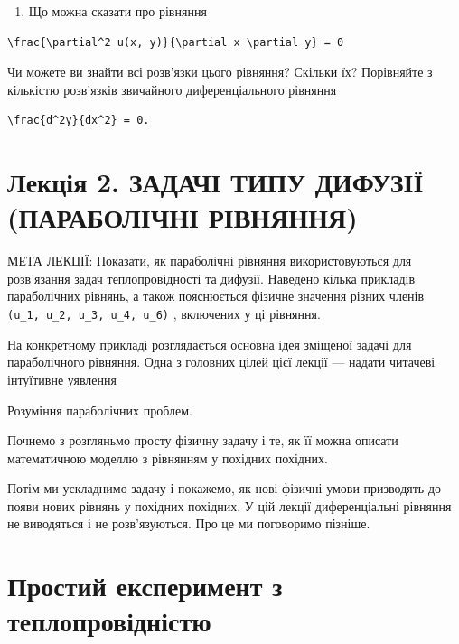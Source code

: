 \documentclass[
  ukrainian,
]{article}
\providecommand{\tightlist}{%
  \setlength{\itemsep}{0pt}\setlength{\parskip}{0pt}}
\begin{document}
\begin{enumerate}
\def\labelenumi{\arabic{enumi}.}
\setcounter{enumi}{4}
\tightlist
\item
  Що можна сказати про рівняння
\end{enumerate}

\begin{verbatim}
\frac{\partial^2 u(x, y)}{\partial x \partial y} = 0
\end{verbatim}

Чи можете ви знайти всі розв'язки цього рівняння? Скільки їх? Порівняйте
з кількістю розв'язків звичайного диференціального рівняння

\begin{verbatim}
\frac{d^2y}{dx^2} = 0.
\end{verbatim}

\section{Лекція 2. ЗАДАЧІ ТИПУ ДИФУЗІЇ (ПАРАБОЛІЧНІ
РІВНЯННЯ)}\label{ux43bux435ux43aux446ux456ux44f-2.-ux437ux430ux434ux430ux447ux456-ux442ux438ux43fux443-ux434ux438ux444ux443ux437ux456ux457-ux43fux430ux440ux430ux431ux43eux43bux456ux447ux43dux456-ux440ux456ux432ux43dux44fux43dux43dux44f}

МЕТА ЛЕКЦІЇ: Показати, як параболічні рівняння використовуються для
розв'язання задач теплопровідності та дифузії. Наведено кілька прикладів
параболічних рівнянь, а також пояснюється фізичне значення різних членів
\texttt{(u\_1,\ u\_2,\ u\_3,\ u\_4,\ u\_6)} , включених у ці рівняння.

На конкретному прикладі розглядається основна ідея зміщеної задачі для
параболічного рівняння. Одна з головних цілей цієї лекції --- надати
читачеві інтуїтивне уявлення

Розуміння параболічних проблем.

Почнемо з розгляньмо просту фізичну задачу і те, як її можна описати
математичною моделлю з рівнянням у похідних похідних.

Потім ми ускладнимо задачу і покажемо, як нові фізичні умови призводять
до появи нових рівнянь у похідних похідних. У цій лекції диференціальні
рівняння не виводяться і не розв'язуються. Про це ми поговоримо пізніше.

\section{Простий експеримент з
теплопровідністю}\label{ux43fux440ux43eux441ux442ux438ux439-ux435ux43aux441ux43fux435ux440ux438ux43cux435ux43dux442-ux437-ux442ux435ux43fux43bux43eux43fux440ux43eux432ux456ux434ux43dux456ux441ux442ux44e}
\end{document}
